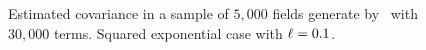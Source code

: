 \begin{figure}[H]
 \centering
 \caption{Estimated covariance in a sample of $5,000$ fields generate by \kle\ with $30,000$ terms. Squared exponential case with $\ell = 0.1$.}
 \label{covar_sexpKL}
\end{figure}
